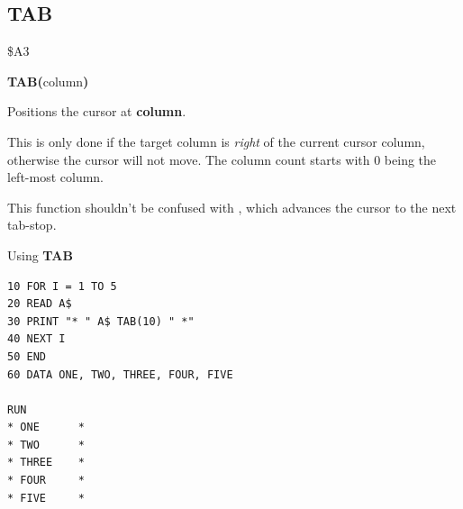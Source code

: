 \subsection{TAB}
\begin{description}[leftmargin=2cm,style=nextline]
\item [Token:]    \$A3

\item [Format:]   {\bf TAB(}column{\bf)}

\item [Returns:]  Positions the cursor at {\bf column}.

                  This is only done if the target column is {\it right} of the current cursor column, otherwise the cursor will not move. The column count starts with 0 being the left-most column.

\item [Remarks:]  This function shouldn't be confused with , which advances the cursor to the next tab-stop.

\item [Example:]  Using {\bf TAB}

\begin{tcolorbox}[colback=black,coltext=white]
\verbatimfont{\codefont}
\begin{verbatim}
10 FOR I = 1 TO 5
20 READ A$
30 PRINT "* " A$ TAB(10) " *"
40 NEXT I
50 END
60 DATA ONE, TWO, THREE, FOUR, FIVE

RUN
* ONE      *
* TWO      *
* THREE    *
* FOUR     *
* FIVE     *
\end{verbatim}
\end{tcolorbox}
\end{description}


\newpage
